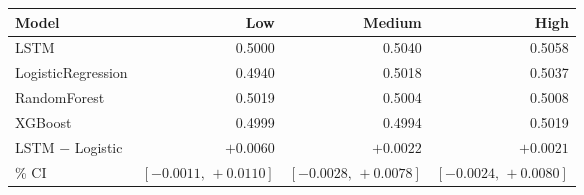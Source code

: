 \begin{tabular}{lrrr}
\toprule
Model & Low & Medium & High \\
\midrule
LSTM & 0.5000 & 0.5040 & 0.5058 \\
LogisticRegression & 0.4940 & 0.5018 & 0.5037 \\
RandomForest & 0.5019 & 0.5004 & 0.5008 \\
XGBoost & 0.4999 & 0.4994 & 0.5019 \\
\midrule
LSTM $-$ Logistic & $+0.0060$ & $+0.0022$ & $+0.0021$ \\
\quad 95\% CI & $[-0.0011,\,+0.0110]$ & $[-0.0028,\,+0.0078]$ & $[-0.0024,\,+0.0080]$ \\
\bottomrule
\end{tabular}
